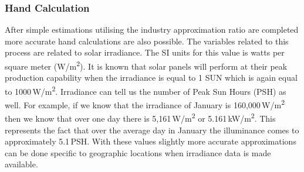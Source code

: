 \subsubsection{Hand Calculation}

After simple estimations utilising the industry approximation ratio are completed more accurate hand calculations are also possible. The variables related to this process are related to solar irradiance. The SI units for this value is watts per square meter (W/\si{m^2}). It is known that solar panels will perform at their peak production capability when the irradiance is equal to 1 SUN which is again equal to 1000\,W/\si{m^2}. Irradiance can tell us the number of Peak Sun Hours (PSH) as well. For example, if we know that the irradiance of January is 160,000\,W/\si{m^2} then we know that over one day there is 5,161\,W/\si{m^2} or 5.161\,kW/\si{m^2}. This represents the fact that over the average day in January the illuminance comes to approximately 5.1\,PSH. With these values slightly more accurate approximations can be done specific to geographic locations when irradiance data is made available.       
    